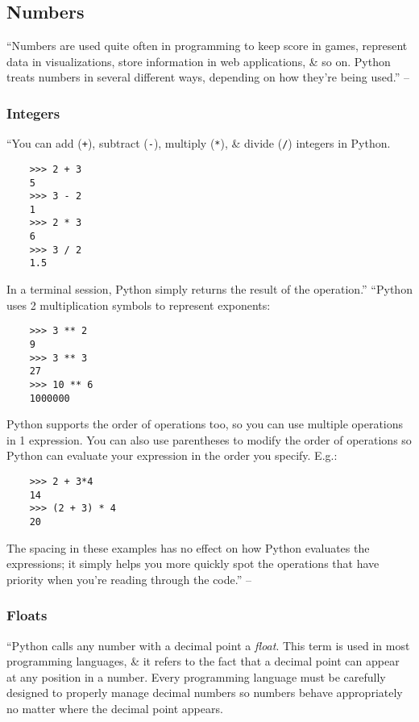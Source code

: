 \documentclass[oneside]{book}
\numberwithin{equation}{section}
\begin{document}
\subsection{Numbers}
``Numbers are used quite often in programming to keep score in games, represent data in visualizations, store information in web applications, \& so on. Python treats numbers in several different ways, depending on how they're being used.'' -- \cite[p. 25]{Matthes2019}

\subsubsection{Integers}
``You can add (\texttt{+}), subtract (\texttt{-}), multiply (\texttt{*}), \& divide (\texttt{/}) integers in Python.
\begin{verbatim}
	>>> 2 + 3
	5
	>>> 3 - 2
	1
	>>> 2 * 3
	6
	>>> 3 / 2
	1.5
\end{verbatim}
In a terminal session, Python simply returns the result of the operation.'' ``Python uses 2 multiplication symbols to represent exponents:
\begin{verbatim}
	>>> 3 ** 2
	9
	>>> 3 ** 3
	27
	>>> 10 ** 6
	1000000
\end{verbatim}
Python supports the order of operations too, so you can use multiple operations in 1 expression. You can also use parentheses to modify the order of operations so Python can evaluate your expression in the order you specify. E.g.:
\begin{verbatim}
	>>> 2 + 3*4
	14
	>>> (2 + 3) * 4
	20
\end{verbatim}
The spacing in these examples has no effect on how Python evaluates the expressions; it simply helps you more quickly spot the operations that have priority when you're reading through the code.'' -- \cite[p. 26]{Matthes2019}

\subsubsection{Floats}
``Python calls any number with a decimal point a \textit{float}. This term is used in most programming languages, \& it refers to the fact that a decimal point can appear at any position in a number. Every programming language must be carefully designed to properly manage decimal numbers so numbers behave appropriately no matter where the decimal point appears.
\end{document}
